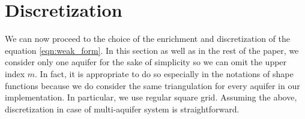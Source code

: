 \documentclass{elsarticle}
\def\vc#1{\mathbf{\boldsymbol{#1}}}     %
\newcommand{\dd}{\; \mathrm{d}}
\newcommand{\bx}{\vc{x}}
\begin{document}

\section{Discretization}
\label{sec:discretization}
We can now proceed to the choice of the enrichment and discretization of the equation \eqref{eqn:weak_form}.
In this section as well as in the rest of the paper, we consider only one aquifer for the sake of simplicity
so we can omit the upper index $m$. 
In fact, it is appropriate to do so especially in the notations of shape functions 
because we do consider the same triangulation for every aquifer in our implementation. 
In particular, we use regular square grid. Assuming the above, discretization in case of multi-aquifer system is straightforward.
\end{document}
